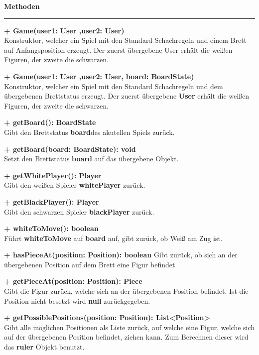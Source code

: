 \documentclass[parskip=full]{scrartcl}
\begin{document}
				 \textbf{\large{Methoden}}
				 \newline
		 		\rule{\textwidth}{1pt}
	 			\begin{description}
					 \item \textbf{+ Game(user1: User ,user2: User)}\\ Konstruktor, welcher ein Spiel mit den Standard Schachregeln und einem Brett auf Anfangsposition erzeugt. Der zuerst übergebene User erhält die weißen Figuren, der zweite die schwarzen.
					 \item \textbf{+ Game(user1: User ,user2: User, board: BoardState)}\\ Konstruktor, welcher ein Spiel mit den Standard Schachregeln und dem übergebenen Brettstatus erzeugt. Der zuerst übergebene \textbf{User} erhält die weißen Figuren, der zweite die schwarzen.
					 \item \textbf{+ getBoard(): BoardState}\\ Gibt den Brettstatus \textbf{board}des akutellen Spiels zurück.
					\item \textbf{+ getBoard(board: BoardState): void}\\ Setzt den Brettstatus \textbf{board} auf das übergebene Objekt.
					\item \textbf{+ getWhitePlayer(): Player}\\ Gibt den weißen Spieler \textbf{whitePlayer} zurück.
					\item \textbf{+ getBlackPlayer(): Player}\\ Gibt den schwarzen Spieler \textbf{blackPlayer} zurück.
					\item \textbf{+ whiteToMove(): boolean}\\ Führt \textbf{whiteToMove} auf \textbf{board} auf, gibt zurück, ob Weiß am Zug ist.
					\item \textbf{+ hasPieceAt(position: Position): boolean} Gibt zurück, ob sich an der übergebenen Position auf dem Brett eine Figur befindet.
					\item \textbf{+ getPieceAt(position: Position): Piece}\\ Gibt die Figur zurück, welche sich an der übergebenen Position befindet. Ist die Position nicht besetzt wird \textbf{null} zurückgegeben.             
					\item \textbf{+ getPossiblePositions(position: Position): List<Position>}\\ Gibt alle möglichen Positionen als Liste zurück, auf welche eine Figur, welche sich auf der übergebenen Position befindet, ziehen kann. Zum Berechnen dieser wird das \textbf{ruler} Objekt benutzt.

\end{description}
\end{document}
